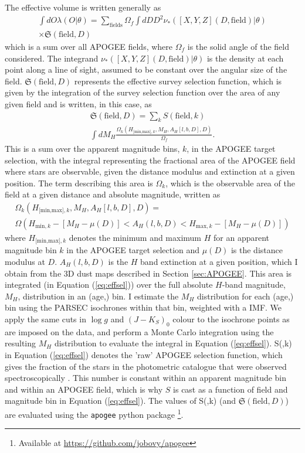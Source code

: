  The effective volume is written generally as
  \begin{multline}
 \label{eq:effvol}
 \int dO \lambda(O|\theta) = \sum_{\text{fields}} \Omega_f \int dD D^2 \nu_*([X,Y,Z](D,\text{field})|\theta)\\ \times \mathfrak{S}(\text{field},D)
 \end{multline}
 which is a sum over all APOGEE fields, where $\Omega_f$ is the solid angle of the field considered. The integrand $ \nu_*([X,Y,Z](D,\text{field})|\theta)$ is the density at each point along a line of sight, assumed to be constant over the angular size of the field. $\mathfrak{S}(\text{field},D)$ represents the effective survey selection function, which is given by the integration of the survey selection function over the area of any given field and is written, in this case, as
 \begin{multline}
 \mathfrak{S}(\text{field}, D) = \sum_k S(\text{field},k) \\ \int dM_H \frac{\Omega_k(H_{\text{[min,max]},k}, M_H, A_H[l,b,D], D)}{\Omega_f}.
 \label{eq:effsel}
 \end{multline}
 This is a sum over the apparent magnitude bins, $k$, in the APOGEE target selection, with the integral representing the fractional area of the APOGEE field where stars are observable, given the distance modulus and extinction at a given position. The term describing this area is $\Omega_k$, which is the observable area of the field at a given distance and absolute magnitude, written as
 \begin{multline}
 \Omega_k(H_{\text{[min,max]},k}, M_H, A_H[l,b,D], D) =\\ \Omega(H_{\text{min},k} - [M_H - \mu(D)] < A_H(l,b,D) < H_{\text{max},k} - [M_H - \mu(D)])
 \end{multline}
 where $H_{\text{[min,max]},k}$ denotes the minimum and maximum $H$ for an apparent magnitude bin $k$ in the APOGEE target selection and $\mu(D)$ is the distance modulus at $D$.  $A_H(l,b,D)$ is the $H$ band extinction at a given position, which I obtain from the 3D dust maps described in Section \ref{sec:APOGEE}. This area is integrated (in Equation (\ref{eq:effsel})) over the full absolute $H$-band magnitude, $M_H$, distribution in an (age,\feh{}) bin. I estimate the $M_H$ distribution for each (age,\feh{}) bin using the PARSEC isochrones \citep{2012MNRAS.427..127B} within that bin, weighted with a \citet{2003PASP..115..763C} IMF. We apply the same cuts in $\log{g}$ and $(J-K_S)_0$ colour to the isochrone points as are imposed on the data, and perform a Monte Carlo integration using the resulting $M_H$ distribution to evaluate the integral in Equation (\ref{eq:effsel}). S(,k) in Equation (\ref{eq:effsel}) denotes the 'raw' APOGEE selection function, which gives the fraction of the stars in the photometric catalogue that were observed spectroscopically \citep[see][for details]{2013AJ....146...81Z}. This number is constant within an apparent magnitude bin and within an APOGEE field, which is why $S$ is cast as a function of field and magnitude bin in Equation (\ref{eq:effsel}). The values of S(,k) (and $\mathfrak{S}(\text{field}, D)$) are evaluated using the \texttt{apogee} python package \footnote{Available at \url{https://github.com/jobovy/apogee}}.

